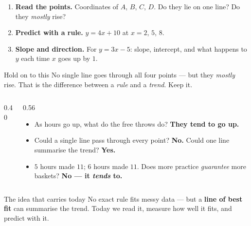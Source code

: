 \documentclass[aspectratio=169, 11pt]{beamer}
\newcommand{\lgrid}[4]{%
  \draw[step=1, linegray!40, very thin] (#1,#3) grid (#2,#4);
  \draw[->, thick, charcoal] (#1,0)--(#2,0) node[below right, font=\tiny]{$x$};
  \draw[->, thick, charcoal] (0,#3)--(0,#4) node[left, font=\tiny]{$y$};}
\newcommand{\dpt}[2]{\fill[navy] (#1,#2) circle (2.8pt);}
\newcommand{\ftdata}{\dpt{1}{4}\dpt{2}{4}\dpt{3}{7}\dpt{4}{7}\dpt{5}{11}\dpt{6}{11}\dpt{7}{12}\dpt{8}{14}}
\begin{document}
\begin{frame}[t, plain]
  \begin{enumerate}\setlength{\itemsep}{7pt}
    \item \textbf{Read the points.} Coordinates of $A$, $B$, $C$, $D$. Do they lie on one line?
          Do they \emph{mostly} rise?
    \item \textbf{Predict with a rule.} $y=4x+10$ at $x=2$, $5$, $8$.
    \item \textbf{Slope and direction.} For $y=3x-5$: slope, intercept, and what happens to $y$
          each time $x$ goes up by $1$.
  \end{enumerate}
  \vspace{6pt}
  \begin{block}{Hold on to this}
    No single line goes through all four points --- but they \emph{mostly} rise. That is the
    difference between a \emph{rule} and a \emph{trend}. Keep it.
  \end{block}
\end{frame}

\begin{frame}[t, plain]
  \begin{columns}[T]
    \begin{column}{0.40\textwidth}
      \centering
    \end{column}
    \begin{column}{0.56\textwidth}
      \begin{itemize}\setlength{\itemsep}{5pt}
        \item As hours go up, what do the free throws do? \; \textbf{They tend to go up.}
        \item Could a single line pass through every point? \; \textbf{No.} \; Could one line
              summarise the trend? \; \textbf{Yes.}
        \item $5$ hours made $11$; $6$ hours made $11$. Does more practice \emph{guarantee}
              more baskets? \; \textbf{No --- it \emph{tends} to.}
      \end{itemize}
    \end{column}
  \end{columns}
  \vspace{4pt}
  \begin{block}{The idea that carries today}
    No exact rule fits messy data --- but a \textbf{line of best fit} can summarise the trend.
    Today we read it, measure how well it fits, and predict with it.
  \end{block}
\end{frame}
\end{document}
